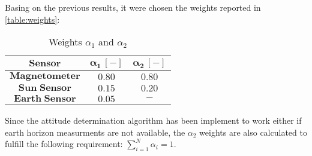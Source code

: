 Basing on the previous results, it were chosen the weights reported in \autoref{table:weights}:

\begin{table}[H]

    \centering
    \begin{tabular}{|c|c|c|}
    \hline
    $\bm{Sensor}$ & $\bm{\alpha_{1}\, [-]}$ & $\bm{\alpha_{2} \, [-]}$ \\
    \hline
    $\bm{Magnetometer}$ & $0.80$ & $0.80$  \\
    \hline
    $\bm{Sun\;Sensor}$ & $0.15$ & $0.20$  \\
    \hline
    $\bm{Earth\;Sensor}$ & $0.05$ & $\bm{-}$  \\
    \hline
    \end{tabular}
    
    \caption{Weights $\alpha_{1}$ and $\alpha_{2}$}
    \label{table:weights}
    
\end{table}

Since the attitude determination algorithm has been implement to work either if earth horizon measurments are not available, the $\alpha_2$ weights are also calculated to fulfill the following requirement: $\sum_{i=1}^N\alpha_i=1$.